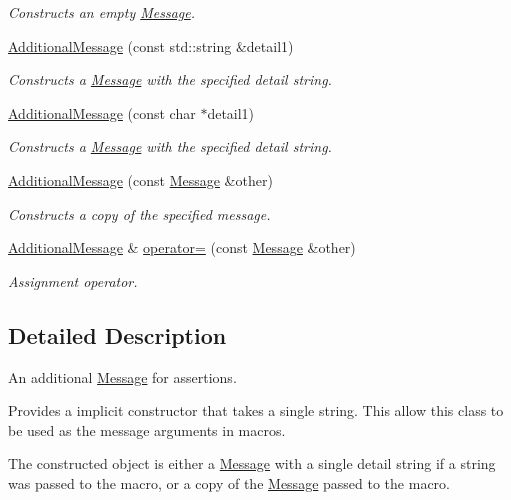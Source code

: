 \begin{DoxyCompactItemize}
\begin{DoxyCompactList}\small\item\em Constructs an empty \hyperlink{class_message}{Message}. \end{DoxyCompactList}\item 
\hyperlink{class_additional_message_a990455bbfe260bc04f99e5acc58d1c06}{Additional\+Message} (const std\+::string \&detail1)
\begin{DoxyCompactList}\small\item\em Constructs a \hyperlink{class_message}{Message} with the specified detail string. \end{DoxyCompactList}\item 
\hyperlink{class_additional_message_a6486540f9b5d1957230e9e1f969adc9d}{Additional\+Message} (const char $\ast$detail1)
\begin{DoxyCompactList}\small\item\em Constructs a \hyperlink{class_message}{Message} with the specified detail string. \end{DoxyCompactList}\item 
\hyperlink{class_additional_message_a75735b6fd65686f31349d01c97c73bc7}{Additional\+Message} (const \hyperlink{class_message}{Message} \&other)
\begin{DoxyCompactList}\small\item\em Constructs a copy of the specified message. \end{DoxyCompactList}\item 
\hyperlink{class_additional_message}{Additional\+Message} \& \hyperlink{class_additional_message_abbda0de4323f70ff01a9b622a6f550f7}{operator=} (const \hyperlink{class_message}{Message} \&other)
\begin{DoxyCompactList}\small\item\em Assignment operator. \end{DoxyCompactList}\end{DoxyCompactItemize}


\subsection{Detailed Description}
An additional \hyperlink{class_message}{Message} for assertions.

Provides a implicit constructor that takes a single string. This allow this class to be used as the message arguments in macros. 

The constructed object is either a \hyperlink{class_message}{Message} with a single detail string if a string was passed to the macro, or a copy of the \hyperlink{class_message}{Message} passed to the macro.

